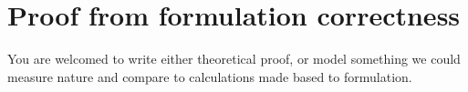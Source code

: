 %
%
%

\chapter{Proof from formulation correctness}

You are welcomed to write either theoretical proof, or model something we
could measure nature and compare to calculations made based to formulation.

